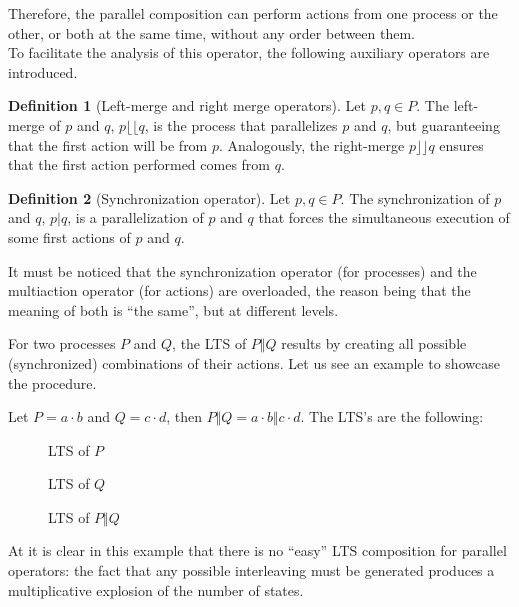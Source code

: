 \documentclass[11pt]{article}
\theoremstyle{definition}
\newtheorem{definition}{Definition}
\theoremstyle{plain}
\begin{document}
Therefore, the parallel composition can perform actions from one process or the other, or both at the same time, without any order between them. \\
To facilitate the analysis of this operator, the following auxiliary operators are introduced.
\begin{definition} [Left-merge and right merge operators]
	Let $ p, q \in P $. The left-merge of $ p $ and $ q $, $ p \lfloor\!\lfloor q $, is the process that parallelizes $ p $ and $ q $, but guaranteeing that the first action will be from $ p $. Analogously, the right-merge $ p \rfloor\!\rfloor q $ ensures that the first action performed comes from $ q $.
\end{definition} 
\begin{definition} [Synchronization operator]
	Let $ p, q \in P $. The synchronization of $ p $ and $ q $, $ p\vert q $, is a parallelization of $ p $ and $ q $ that forces the simultaneous execution of some first actions of $ p $ and $ q $.
\end{definition}
It must be noticed that the synchronization operator (for processes) and the multiaction operator (for actions) are overloaded, the reason being that the meaning of both is ``the same'', but at different levels.

For two processes $ P $ and $ Q $, the LTS of $ P \Vert Q $ results by creating all possible (synchronized) combinations of their actions. Let us see an example to showcase the procedure.

Let $ P = a\cdot b $ and $ Q = c\cdot d $, then $ P \Vert Q = a\cdot b \Vert c\cdot d $. The LTS's are the following:
\begin{figure} [H]
	\centering
	
	\caption{LTS of $ P $} \label{fig:ParallelCompositionP}
	\endminipage\hfill
	\centering
	
	\caption{LTS of $ Q $} \label{fig:ParallelCompositionQ}
	\endminipage\hfill
\end{figure}
\begin{figure} [H]
	\centering
	
	\caption{LTS of $ P \Vert Q$} \label{fig:ParallelCompositionPQ}
\end{figure}

At it is clear in this example that there is no ``easy'' LTS composition for parallel operators: the fact that any possible interleaving must be generated produces a multiplicative explosion of the number of states.
\end{document}
